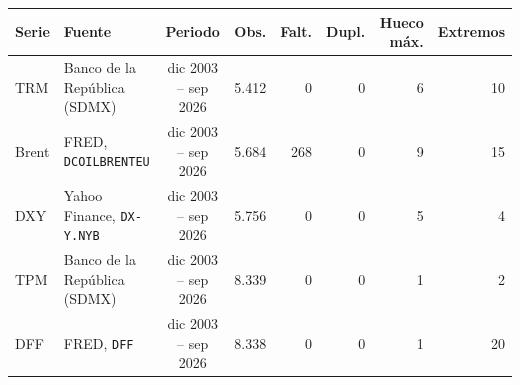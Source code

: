 \begin{tabular}{llcrrrrr}
\toprule
Serie & Fuente & Periodo & Obs. & Falt. & Dupl. & Hueco máx. & Extremos \\
\midrule
TRM & Banco de la República (SDMX) & dic 2003 -- sep 2026 & 5.412 & 0 & 0 & 6 & 10 \\
Brent & FRED, \texttt{DCOILBRENTEU} & dic 2003 -- sep 2026 & 5.684 & 268 & 0 & 9 & 15 \\
DXY & Yahoo Finance, \texttt{DX-Y.NYB} & dic 2003 -- sep 2026 & 5.756 & 0 & 0 & 5 & 4 \\
TPM & Banco de la República (SDMX) & dic 2003 -- sep 2026 & 8.339 & 0 & 0 & 1 & 2 \\
DFF & FRED, \texttt{DFF} & dic 2003 -- sep 2026 & 8.338 & 0 & 0 & 1 & 20 \\
\bottomrule
\end{tabular}
